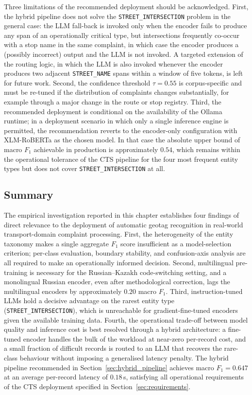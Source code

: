 Three limitations of the recommended deployment should be acknowledged. First, the hybrid pipeline does not solve the \texttt{STREET\_INTERSECTION} problem in the general case: the LLM fall-back is invoked only when the encoder fails to produce any span of an operationally critical type, but intersections frequently co-occur with a stop name in the same complaint, in which case the encoder produces a (possibly incorrect) output and the LLM is not invoked. A targeted extension of the routing logic, in which the LLM is also invoked whenever the encoder produces two adjacent \texttt{STREET\_NAME} spans within a window of five tokens, is left for future work. Second, the confidence threshold $\tau = 0.55$ is corpus-specific and must be re-tuned if the distribution of complaints changes substantially, for example through a major change in the route or stop registry. Third, the recommended deployment is conditional on the availability of the Ollama runtime; in a deployment scenario in which only a single inference engine is permitted, the recommendation reverts to the encoder-only configuration with XLM-RoBERTa as the chosen model. In that case the absolute upper bound of macro $F_1$ achievable in production is approximately $0.54$, which remains within the operational tolerance of the CTS pipeline for the four most frequent entity types but does not cover \texttt{STREET\_INTERSECTION} at all.

\subsection{Summary}
\label{sec:chapter3_summary}

The empirical investigation reported in this chapter establishes four findings of direct relevance to the deployment of automatic geotag recognition in real-world transport-domain complaint processing. First, the heterogeneity of the entity taxonomy makes a single aggregate $F_1$ score insufficient as a model-selection criterion; per-class evaluation, boundary stability, and confusion-axis analysis are all required to make an operationally informed decision. Second, multilingual pre-training is necessary for the Russian--Kazakh code-switching setting, and a monolingual Russian encoder, even after methodological correction, lags the multilingual encoders by approximately $0.20$ macro $F_1$. Third, instruction-tuned LLMs hold a decisive advantage on the rarest entity type (\texttt{STREET\_INTERSECTION}), which is unreachable for gradient-fine-tuned encoders given the available training data. Fourth, the operational trade-off between model quality and inference cost is best resolved through a hybrid architecture: a fine-tuned encoder handles the bulk of the workload at near-zero per-record cost, and a small fraction of difficult records is routed to an LLM that recovers the rare-class behaviour without imposing a generalised latency penalty. The hybrid pipeline recommended in Section~\ref{sec:hybrid_pipeline} achieves macro $F_1 = 0.647$ at an average per-record latency of $0.18$\,s, satisfying all operational requirements of the CTS deployment specified in Section~\ref{sec:requirements}.
